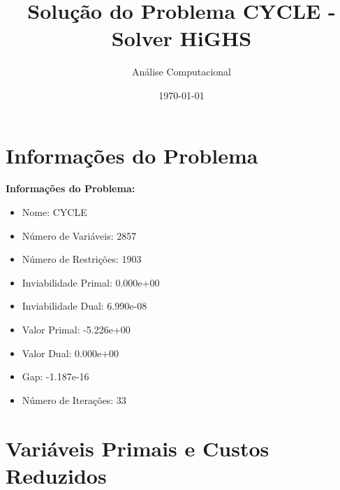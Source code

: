 \documentclass[12pt]{article}
\title{Solução do Problema CYCLE - Solver HiGHS}
\author{Análise Computacional}
\date{\today}
\begin{document}
\maketitle

\section{Informações do Problema}

\textbf{Informações do Problema:}
\begin{itemize}
\item Nome: CYCLE
\item Número de Variáveis: 2857
\item Número de Restrições: 1903
\item Inviabilidade Primal: 0.000e+00
\item Inviabilidade Dual: 6.990e-08
\item Valor Primal: -5.226e+00
\item Valor Dual: 0.000e+00
\item Gap: -1.187e-16
\item Número de Iterações: 33
\end{itemize}


\section{Variáveis Primais e Custos Reduzidos}
\end{document}
